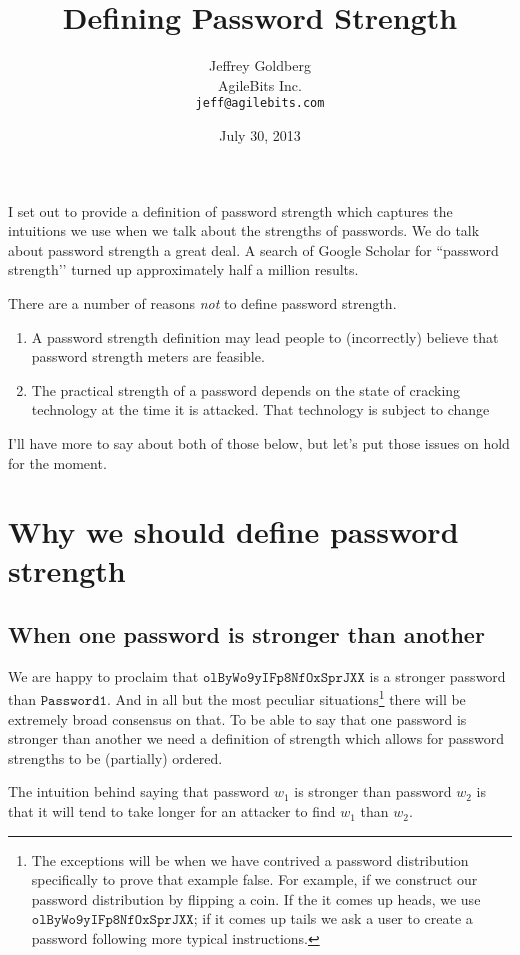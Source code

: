 \documentclass[12pt]{article}
\title{Defining Password Strength}
\author{Jeffrey Goldberg\\
AgileBits Inc.\\
\texttt{jeff@agilebits.com}}
\date{July 30, 2013} %
\newcommand\pwd[1]{\ensuremath{\mathtt{#1}}}
\begin{document}
\maketitle

I set out to provide a definition of password strength which captures the intuitions we use when we talk about the strengths of passwords. We do talk about password strength a great deal. A search of Google Scholar for ``password strength’’ turned up approximately half a million results.


There are a number of reasons \emph{not} to define password strength.
\begin{enumerate}
\item A password strength definition may lead people to (incorrectly) believe that password strength meters are feasible.
\item The practical strength of a password depends on the state of cracking technology at the time it is attacked. That technology is subject to change
\end{enumerate}
I’ll have more to say about both of those below, but let’s put those issues on hold for the moment.


\section{Why we should define password strength}

\subsection{When one password is stronger than another}

We are happy to proclaim that \pwd{
olByWo9yIFp8NfOxSprJXX} is a stronger password than  \pwd{Password1}. And in all but the most peculiar situations\footnote{The exceptions will be when we have contrived a password distribution specifically to prove that example false. For example, if we construct our password distribution by flipping a coin. If the it comes up heads, we use \pwd{olByWo9yIFp8NfOxSprJXX}; if it comes up tails we ask a user to create a password following more typical instructions.} there will be extremely broad consensus on that. To be able to say that one password is stronger than another we need a definition of strength which allows for password strengths to be (partially) ordered.

The intuition behind saying that password $w_{1}$ is stronger than password $w_{2}$ is that it will tend to take longer for an attacker to find $w_{1}$ than $w_{2}$.
\end{document}
